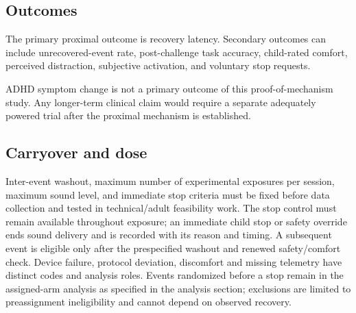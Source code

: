 \subsection{Outcomes}

The primary proximal outcome is recovery latency. Secondary outcomes can include unrecovered-event rate, post-challenge task accuracy, child-rated comfort, perceived distraction, subjective activation, and voluntary stop requests.

ADHD symptom change is not a primary outcome of this proof-of-mechanism study. Any longer-term clinical claim would require a separate adequately powered trial after the proximal mechanism is established.

\subsection{Carryover and dose}

Inter-event washout, maximum number of experimental exposures per session, maximum sound level, and immediate stop criteria must be fixed before data collection and tested in technical/adult feasibility work. The stop control must remain available throughout exposure; an immediate child stop or safety override ends sound delivery and is recorded with its reason and timing. A subsequent event is eligible only after the prespecified washout and renewed safety/comfort check. Device failure, protocol deviation, discomfort and missing telemetry have distinct codes and analysis roles. Events randomized before a stop remain in the assigned-arm analysis as specified in the analysis section; exclusions are limited to preassignment ineligibility and cannot depend on observed recovery.
